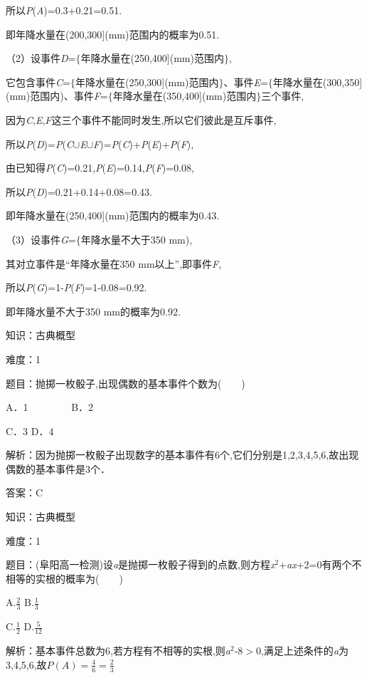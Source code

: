 \documentclass{article} %
\begin{document}
所以\textit{P}(\textit{A})=0.3+0.21=0.51.

即年降水量在(200,300](mm)范围内的概率为0.51.

（2）设事件\textit{D}=$\mathrm{\{}$年降水量在(250,400](mm)范围内$\mathrm{\}}$,

它包含事件\textit{C}=$\mathrm{\{}$年降水量在(250,300](mm)范围内$\mathrm{\}}$、事件\textit{E}=$\mathrm{\{}$年降水量在(300,350](mm)范围内)、事件\textit{F}=$\mathrm{\{}$年降水量在(350,400](mm)范围内$\mathrm{\}}$三个事件,

因为\textit{C},\textit{E},\textit{F}这三个事件不能同时发生,所以它们彼此是互斥事件,

所以\textit{P}(\textit{D})=\textit{P}(\textit{C}$\mathrm{\cup}$\textit{E}$\mathrm{\cup}$\textit{F})=\textit{P}(\textit{C})+\textit{P}(\textit{E})+\textit{P}(\textit{F}),

由已知得\textit{P}(\textit{C})=0.21,\textit{P}(\textit{E})=0.14,\textit{P}(\textit{F})=0.08,

所以\textit{P}(\textit{D})=0.21+0.14+0.08=0.43.

即年降水量在(250,400](mm)范围内的概率为0.43.

（3）设事件\textit{G}=$\mathrm{\{}$年降水量不大于350 mm),

其对立事件是``年降水量在350 mm以上'',即事件\textit{F},

所以\textit{P}(\textit{G})=1-\textit{P}(\textit{F})=1-0.08=0.92.

即年降水量不大于350 mm的概率为0.92.



知识：古典概型

难度：1

题目：抛掷一枚骰子,出现偶数的基本事件个数为(　　)

A．1　　　　 B．2

C．3         D．4

解析：因为抛掷一枚骰子出现数字的基本事件有6个,它们分别是1,2,3,4,5,6,故出现偶数的基本事件是3个．

答案：C

知识：古典概型

难度：1

题目：(阜阳高一检测)设\textit{a}是抛掷一枚骰子得到的点数,则方程\textit{x}${}^{2}$+\textit{ax}+2=0有两个不相等的实根的概率为(　　)

A.$\frac{2}{3}$  B.$\frac{1}{3}$

C.$\frac{1}{2}$  D.$\frac{5}{12}$

解析：基本事件总数为6,若方程有不相等的实根,则\textit{a}${}^{2}$-8$\mathrm{>}$0,满足上述条件的\textit{a}为3,4,5,6,故$P(A)=\frac{4}{6}=\frac{2}{3}$
\end{document}
